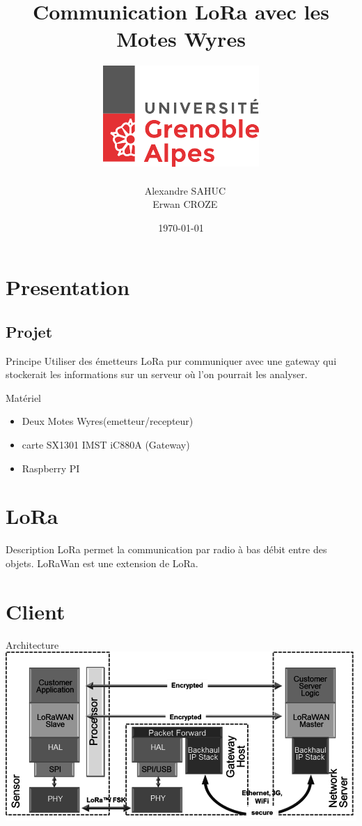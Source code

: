 \documentclass{beamer}
\title{Communication LoRa avec les Motes Wyres}
\author{\includegraphics[scale=0.3]{univ.png} \\~ \\ ~ Alexandre SAHUC\\~ Erwan CROZE}
\institute{Université Joseph Fourier \newline M2M}
\date{\today}
\begin{document}
\begin{frame}
	\titlepage
\end{frame}

\section{Presentation}
\subsection{Projet}
\begin{frame}
  	\begin{block}{Principe}
  		Utiliser des émetteurs LoRa pur communiquer avec une gateway qui stockerait les informations sur un serveur où l'on pourrait les analyser.
	\end{block}
	
	\begin{exampleblock}{Matériel}
		\begin{itemize}
			\item Deux Motes Wyres(emetteur/recepteur)
			\item carte SX1301 IMST iC880A (Gateway)
			\item Raspberry PI 
		\end{itemize}			
	\end{exampleblock}
\end{frame}

\section{LoRa}
\begin{frame}
	\begin{block}{Description}
		LoRa permet la communication par radio à bas débit entre des objets.
		LoRaWan est une extension de LoRa.
	\end{block}
\end{frame}

\section{Client}
\begin{frame}
	\begin{block}{Architecture}
		\includegraphics[scale=0.6]{LoRa-network.png}
	\end{block}
\end{frame}
\end{document}
